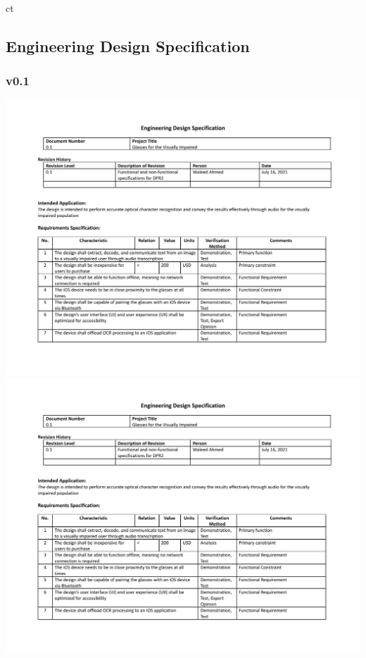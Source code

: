 ct\documentclass[a4paper,11pt]{article}
\begin{document}
\newpage
\begin{landscape}
    \subsection{Engineering Design Specification}
    \subsubsection{v0.1}
    \begin{center}
        \includegraphics[page=1,width={0.86\linewidth}]{pdf/eds_0.1.pdf}
        \newpage
        \includegraphics[page=2,width={0.86\linewidth}]{pdf/eds_0.1.pdf}
    \end{center}
    

\end{landscape}
\end{document}
